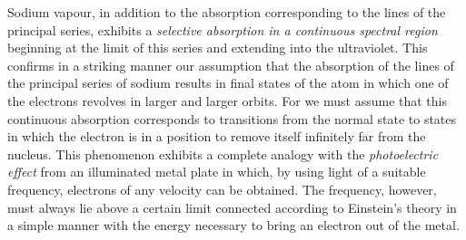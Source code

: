 Sodium vapour, in addition to the absorption corresponding to
the lines of the principal series, exhibits a \emph{selective absorption in a
continuous spectral region} beginning at the limit of this series and
extending into the ultra\Add{-}violet. This confirms in a striking manner
our assumption that the absorption of the lines of the principal
series of sodium results in final states of the atom in which one of
the electrons revolves in larger and larger orbits. For we must
assume that this continuous absorption corresponds to transitions
from the normal state to states in which the electron is in a position
to remove itself infinitely far from the nucleus. This phenomenon
exhibits a complete analogy with the \emph{photoelectric effect} from an
illuminated metal plate in which, by using light of a suitable
frequency, electrons of any velocity can be obtained. The frequency,
however, must always lie above a certain limit connected according
to Einstein's theory in a simple manner with the energy necessary
to bring an electron out of the metal.



